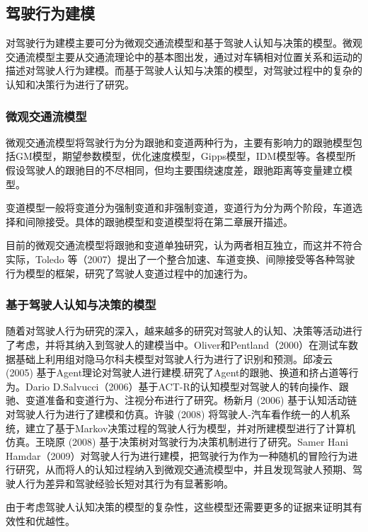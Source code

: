 \subsection{驾驶行为建模}
对驾驶行为建模主要可分为微观交通流模型和基于驾驶人认知与决策的模型。微观交通流模型主要从交通流理论中的基本图出发，通过对车辆相对位置关系和运动的描述对驾驶人行为建模。而基于驾驶人认知与决策的模型，对驾驶过程中的复杂的认知和决策行为进行了研究。
\subsubsection{微观交通流模型}
微观交通流模型将驾驶行为分为跟驰和变道两种行为，主要有影响力的跟驰模型包括GM模型，期望参数模型，优化速度模型，Gipps模型，IDM模型等。各模型所假设驾驶人的跟驰目的不尽相同，但均主要围绕速度差，跟驰距离等变量建立模型。

变道模型一般将变道分为强制变道和非强制变道，变道行为分为两个阶段，车道选择和间隙接受。具体的跟驰模型和变道模型将在第二章展开描述。

目前的微观交通流模型将跟驰和变道单独研究，认为两者相互独立，而这并不符合实际，Toledo 等（2007）提出了一个整合加速、车道变换、间隙接受等各种驾驶行为模型的框架，研究了驾驶人变道过程中的加速行为\cite{Toledo2007}。


\subsubsection{基于驾驶人认知与决策的模型}
随着对驾驶人行为研究的深入，越来越多的研究对驾驶人的认知、决策等活动进行了考虑，并将其纳入到驾驶人的建模当中。Oliver和Pentland（2000）在测试车数据基础上利用组对隐马尔科夫模型对驾驶人行为进行了识别和预测\cite{Oliver2000}。邱凌云 (2005) 基于Agent理论对驾驶人进行建模.研究了Agent的跟驰、换道和挤占道等行为\cite{邱凌云2005}。Dario D.Salvucci（2006）基于ACT-R的认知模型对驾驶人的转向操作、跟驰、变道准备和变道行为、注视分布进行了研究\cite{Salvucci2006}。杨新月 (2006) 基于认知活动链对驾驶人行为进行了建模和仿真\cite{杨新月2006}。许骏 (2008) 将驾驶人-汽车看作统一的人机系统，建立了基于Markov决策过程的驾驶人行为模型，并对所建模型进行了计算机仿真\cite{许骏2008}。王晓原 (2008) 基于决策树对驾驶行为决策机制进行了研究\cite{王晓原2008}。Samer Hani Hamdar（2009）对驾驶人行为进行建模，把驾驶行为作为一种随机的冒险行为进行研究，从而将人的认知过程纳入到微观交通流模型中，并且发现驾驶人预期、驾驶人行为差异和驾驶经验长短对其行为有显著影响\cite{Hamdar2009a}。

由于考虑驾驶人认知决策的模型的复杂性，这些模型还需要更多的证据来证明其有效性和优越性。


